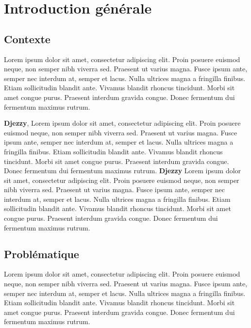 \chapter*{Introduction générale}
\label{chap:introduction}

\section*{Contexte}

Lorem ipsum dolor sit amet, consectetur adipiscing elit. Proin posuere euismod neque, non semper nibh viverra sed. Praesent ut varius magna. Fusce ipsum ante, semper nec interdum at, semper et lacus. Nulla ultrices magna a fringilla finibus. Etiam sollicitudin blandit ante. Vivamus blandit rhoncus tincidunt. Morbi sit amet congue purus. Praesent interdum gravida congue. Donec fermentum dui fermentum maximus rutrum.

\medskip

\textbf{Djezzy}, Lorem ipsum dolor sit amet, consectetur adipiscing elit. Proin posuere euismod neque, non semper nibh viverra sed. Praesent ut varius magna. Fusce ipsum ante, semper nec interdum at, semper et lacus. Nulla ultrices magna a fringilla finibus. Etiam sollicitudin blandit ante. Vivamus blandit rhoncus tincidunt. Morbi sit amet congue purus. Praesent interdum gravida congue. Donec fermentum dui fermentum maximus rutrum. \textbf{Djezzy} Lorem ipsum dolor sit amet, consectetur adipiscing elit. Proin posuere euismod neque, non semper nibh viverra sed. Praesent ut varius magna. Fusce ipsum ante, semper nec interdum at, semper et lacus. Nulla ultrices magna a fringilla finibus. Etiam sollicitudin blandit ante. Vivamus blandit rhoncus tincidunt. Morbi sit amet congue purus. Praesent interdum gravida congue. Donec fermentum dui fermentum maximus rutrum.

\medskip

\section*{Problématique}

Lorem ipsum dolor sit amet, consectetur adipiscing elit. Proin posuere euismod neque, non semper nibh viverra sed. Praesent ut varius magna. Fusce ipsum ante, semper nec interdum at, semper et lacus. Nulla ultrices magna a fringilla finibus. Etiam sollicitudin blandit ante. Vivamus blandit rhoncus tincidunt. Morbi sit amet congue purus. Praesent interdum gravida congue. Donec fermentum dui fermentum maximus rutrum.

